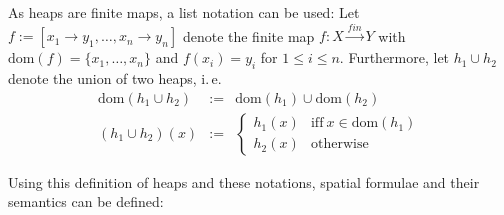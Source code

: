 \documentclass{scrartcl}
\theoremstyle{definition}
\newcommand{\dom}{{\text{dom}}}
\newcommand{\tofin}{\xrightarrow{fin}}
\begin{document}
As heaps are finite maps, a list notation can be used: 
Let $f := [x_1 \to y_1, \ldots, x_n \to y_n]$ denote the finite map $f : X
\tofin Y$ with $\dom(f) = \{x_1, \ldots, x_n\}$ and
$f(x_i) = y_i$ for $1 \leq i \leq n$.
Furthermore, let $h_1 \cup h_2$ denote the union of two heaps, i.\,e.\ 
\begin{eqnarray*}
\dom(h_1 \cup h_2) & := & \dom(h_1) \cup \dom(h_2) \\
(h_1 \cup h_2)(x) & := & \left\{
\begin{array}{ll}
  h_1(x) & \text{iff}\ x \in \dom(h_1)\\
  h_2(x) & \text{otherwise}
\end{array}\right. 
\end{eqnarray*}

Using this definition of heaps and these notations, spatial formulae and their
semantics can be defined:
\end{document}
